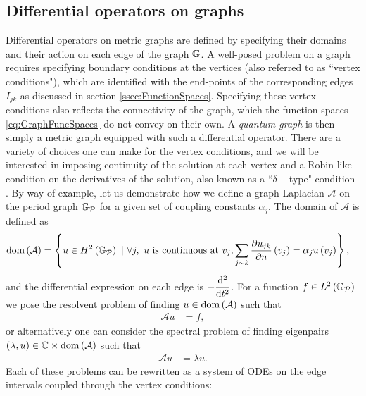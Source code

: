 \subsection{Differential operators on graphs} \label{ssec:DiffOpsOnGraphs}
Differential operators on metric graphs are defined by specifying their domains and their action on each edge of the graph $\mathbb{G}$.
A well-posed problem on a graph requires specifying boundary conditions at the vertices (also referred to as ``vertex conditions"), which are identified with the end-points of the corresponding edges $I_{jk}$ as discussed in section \ref{ssec:FunctionSpaces}.
Specifying these vertex conditions also reflects the connectivity of the graph, which the function spaces \eqref{eq:GraphFuncSpaces} do not convey on their own.
A \emph{quantum graph} is then simply a metric graph equipped with such a differential operator.
There are a variety of choices one can make for the vertex conditions, and we will be interested in imposing continuity of the solution at each vertex and a Robin-like condition on the derivatives of the solution, also known as a ``$\delta-$type" condition \cite{albeverio2012solvable, berkolaiko2013introduction}.
By way of example, let us demonstrate how we define a graph Laplacian $\mathcal{A}$ on the period graph $\mathbb{G}_{\mathcal{P}}$ for a given set of coupling constants $\alpha_j$.
The domain of $\mathcal{A}$ is defined as
\begin{align} \label{eq:GraphLaplacianExample}
	\mathrm{dom}\left( \mathcal{A} \right) &= \left\{  u\in H^2\left( \mathbb{G}_{\mathcal{P}} \right) \ \vert \ \forall j, \ u \text{ is continuous at } v_j, \sum_{j\sim k}\dfrac{\partial u_{jk}}{\partial n}\left( v_j \right) = \alpha_j u\left( v_j \right)  \right\},
\end{align}
and the differential expression on each edge is $-\dfrac{\mathrm{d}^2 }{\mathrm{d} {t}^2}$.
For a function $f\in L^2\left( \mathbb{G}_{\mathcal{P}} \right)$ we pose the resolvent problem of finding $u\in\mathrm{dom}\left( \mathcal{A} \right)$ such that
\begin{align*}
	\mathcal{A}u &= f,
\end{align*}
or alternatively one can consider the spectral problem of finding eigenpairs $\left( \lambda,u \right)\in\mathbb{C}\times\mathrm{dom}\left( \mathcal{A} \right)$ such that
\begin{align*}
	\mathcal{A}u &= \lambda u.
\end{align*}
Each of these problems can be rewritten as a system of ODEs on the edge intervals coupled through the vertex conditions:

